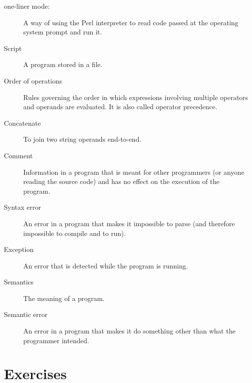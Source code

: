 \begin{description}
\item[one-liner mode:] A way of using the Perl interpreter to read
code passed at the operating system prompt and run it.

\item[Script] A program stored in a file.

\item[Order of operations]  Rules governing the order in which
expressions involving multiple operators and operands are evaluated.
It is also called operator precedence.

\item[Concatenate]  To join two string operands end-to-end.

\item[Comment]  Information in a program that is meant for other
programmers (or anyone reading the source code) and has no effect on the
execution of the program.

\item[Syntax error]  An error in a program that makes it impossible
to parse (and therefore impossible to compile and to run).

\item[Exception]  An error that is detected while the program is running.

\item[Semantics]  The meaning of a program.

\item[Semantic error]   An error in a program that makes it do something
other than what the programmer intended.

\end{description}


\section{Exercises}

